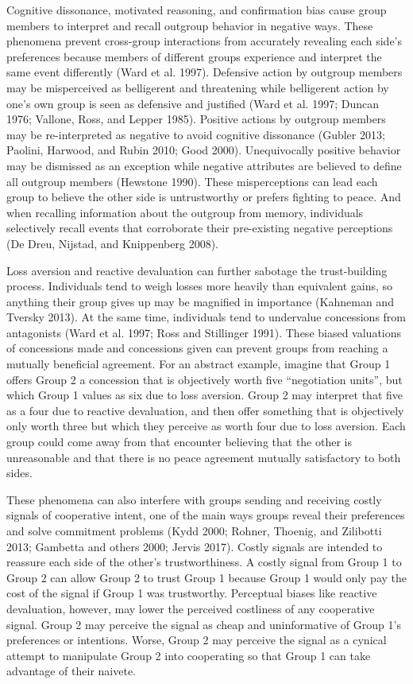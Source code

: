\documentclass[11pt]{article}
\begin{document}
Cognitive dissonance, motivated reasoning, and confirmation bias cause
group members to interpret and recall outgroup behavior in negative
ways. These phenomena prevent cross-group interactions from accurately
revealing each side's preferences because members of different groups
experience and interpret the same event differently (Ward et al. 1997).
Defensive action by outgroup members may be misperceived as belligerent
and threatening while belligerent action by one's own group is seen as
defensive and justified (Ward et al. 1997; Duncan 1976; Vallone, Ross,
and Lepper 1985). Positive actions by outgroup members may be
re-interpreted as negative to avoid cognitive dissonance (Gubler 2013;
Paolini, Harwood, and Rubin 2010; Good 2000). Unequivocally positive
behavior may be dismissed as an exception while negative attributes are
believed to define all outgroup members (Hewstone 1990). These
misperceptions can lead each group to believe the other side is
untrustworthy or prefers fighting to peace. And when recalling
information about the outgroup from memory, individuals selectively
recall events that corroborate their pre-existing negative perceptions
(De Dreu, Nijstad, and Knippenberg 2008).

Loss aversion and reactive devaluation can further sabotage the
trust-building process. Individuals tend to weigh losses more heavily
than equivalent gains, so anything their group gives up may be magnified
in importance (Kahneman and Tversky 2013). At the same time, individuals
tend to undervalue concessions from antagonists (Ward et al. 1997; Ross
and Stillinger 1991). These biased valuations of concessions made and
concessions given can prevent groups from reaching a mutually beneficial
agreement. For an abstract example, imagine that Group 1 offers Group 2
a concession that is objectively worth five ``negotiation units'', but
which Group 1 values as six due to loss aversion. Group 2 may interpret
that five as a four due to reactive devaluation, and then offer
something that is objectively only worth three but which they perceive
as worth four due to loss aversion. Each group could come away from that
encounter believing that the other is unreasonable and that there is no
peace agreement mutually satisfactory to both sides.

These phenomena can also interfere with groups sending and receiving
costly signals of cooperative intent, one of the main ways groups reveal
their preferences and solve commitment problems (Kydd 2000; Rohner,
Thoenig, and Zilibotti 2013; Gambetta and others 2000; Jervis 2017).
Costly signals are intended to reassure each side of the other's
trustworthiness. A costly signal from Group 1 to Group 2 can allow Group
2 to trust Group 1 because Group 1 would only pay the cost of the signal
if Group 1 was trustworthy. Perceptual biases like reactive devaluation,
however, may lower the perceived costliness of any cooperative signal.
Group 2 may perceive the signal as cheap and uninformative of Group 1's
preferences or intentions. Worse, Group 2 may perceive the signal as a
cynical attempt to manipulate Group 2 into cooperating so that Group 1
can take advantage of their naivete.
\end{document}
